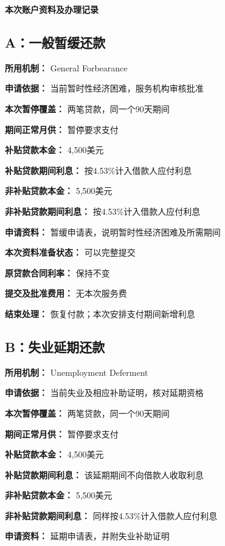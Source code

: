 \documentclass[UTF8,fontset=none,11pt,a4paper]{ctexart}
\begin{document}
{\noindent\fontsize{20}{25}\selectfont\bfseries 本次账户资料及办理记录\par}
\vspace{10pt}
\subsection*{A：一般暂缓还款}
\textbf{所用机制：} General Forbearance


\textbf{申请依据：} 当前暂时性经济困难，服务机构审核批准


\textbf{本次暂停覆盖：} 两笔贷款，同一个90天期间


\textbf{期间正常月供：} 暂停要求支付


\textbf{补贴贷款本金：} 4,500美元


\textbf{补贴贷款期间利息：} 按4.53\%计入借款人应付利息


\textbf{非补贴贷款本金：} 5,500美元


\textbf{非补贴贷款期间利息：} 按4.53\%计入借款人应付利息


\textbf{申请资料：} 暂缓申请表，说明暂时性经济困难及所需期间


\textbf{本次资料准备状态：} 可以完整提交


\textbf{原贷款合同利率：} 保持不变


\textbf{提交及批准费用：} 无本次服务费


\textbf{结束处理：} 恢复付款；本次安排支付期间新增利息


\subsection*{B：失业延期还款}
\textbf{所用机制：} Unemployment Deferment


\textbf{申请依据：} 当前失业及相应补助证明，核对延期资格


\textbf{本次暂停覆盖：} 两笔贷款，同一个90天期间


\textbf{期间正常月供：} 暂停要求支付


\textbf{补贴贷款本金：} 4,500美元


\textbf{补贴贷款期间利息：} 该延期期间不向借款人收取利息


\textbf{非补贴贷款本金：} 5,500美元


\textbf{非补贴贷款期间利息：} 同样按4.53\%计入借款人应付利息


\textbf{申请资料：} 延期申请表，并附失业补助证明
\end{document}
